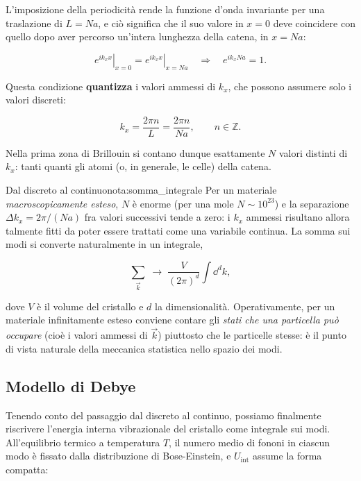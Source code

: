 L'imposizione della periodicità rende la funzione d'onda invariante per una traslazione di \( L = N a \), e ciò significa che il suo valore in \( x = 0 \) deve coincidere con quello dopo aver percorso un'intera lunghezza della catena, in \( x = N a \):

\begin{equation}
    \left. e^{i k_x x} \right|_{x=0} = \left. e^{i k_x x} \right|_{x=N a}
    \quad \Longrightarrow \quad
    e^{i k_x N a} = 1.
\end{equation}

Questa condizione \textbf{quantizza} i valori ammessi di \( k_x \), che possono assumere solo i valori discreti:

\begin{equation}
    k_x = \frac{2 \pi n}{L} = \frac{2 \pi n}{N a}, \qquad n \in \mathbb{Z}.
\end{equation}

Nella prima zona di Brillouin si contano dunque esattamente \( N \) valori distinti di \( k_x \): tanti quanti gli atomi (o, in generale, le celle) della catena.

\begin{note}{Dal discreto al continuo}{nota:somma_integrale}
Per un materiale \emph{macroscopicamente esteso}, \( N \) è enorme (per una mole \( N \sim 10^{23} \)) e la separazione \( \Delta k_x = 2\pi/(N a) \) fra valori successivi tende a zero: i \( k_x \) ammessi risultano allora talmente fitti da poter essere trattati come una variabile continua. La somma sui modi si converte naturalmente in un integrale,

\begin{equation}
    \sum_{\vec{k}} \;\longrightarrow\; \frac{V}{(2\pi)^d} \int \dd^d k,
\end{equation}

dove \( V \) è il volume del cristallo e \( d \) la dimensionalità. Operativamente, per un materiale infinitamente esteso conviene contare gli \emph{stati che una particella può occupare} (cioè i valori ammessi di \( \vec{k} \)) piuttosto che le particelle stesse: è il punto di vista naturale della meccanica statistica nello spazio dei modi.
\end{note}

\subsection{Modello di Debye}

Tenendo conto del passaggio dal discreto al continuo, possiamo finalmente riscrivere l'energia interna vibrazionale del cristallo come integrale sui modi. All'equilibrio termico a temperatura \( T \), il numero medio di fononi in ciascun modo è fissato dalla distribuzione di Bose-Einstein, e \( U_{\text{int}} \) assume la forma compatta:

